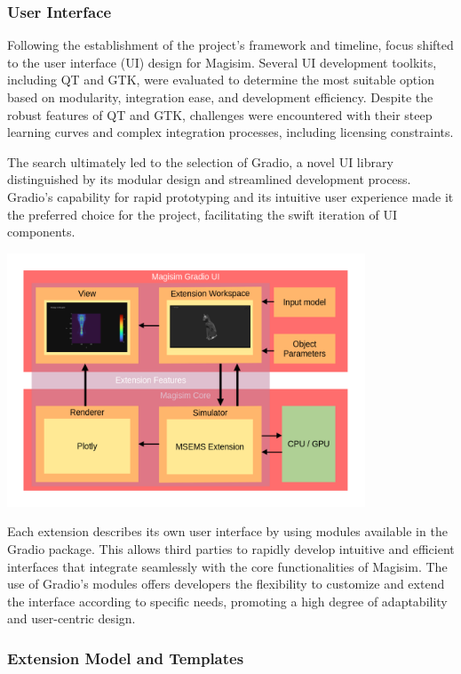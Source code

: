 \documentclass[11pt, a4paper, titlepage]{article}
\begin{document}
\subsubsection{User Interface}

Following the establishment of the project's framework and timeline, focus shifted to the user interface (UI) design for Magisim. Several UI development toolkits, including QT and GTK, were evaluated to determine the most suitable option based on modularity, integration ease, and development efficiency. Despite the robust features of QT and GTK, challenges were encountered with their steep learning curves and complex integration processes, including licensing constraints.

The search ultimately led to the selection of Gradio, a novel UI library distinguished by its modular design and streamlined development process. Gradio's capability for rapid prototyping and its intuitive user experience made it the preferred choice for the project, facilitating the swift iteration of UI components.
\begin{center}
	\includegraphics[width=0.8\textwidth]{softstruct.png}
\end{center}

Each extension describes its own user interface by using modules available in the Gradio package. This allows third parties to rapidly develop intuitive and efficient interfaces that integrate seamlessly with the core functionalities of Magisim. The use of Gradio's modules offers developers the flexibility to customize and extend the interface according to specific needs, promoting a high degree of adaptability and user-centric design.
\newpage
\subsubsection{Extension Model and Templates}
\end{document}
